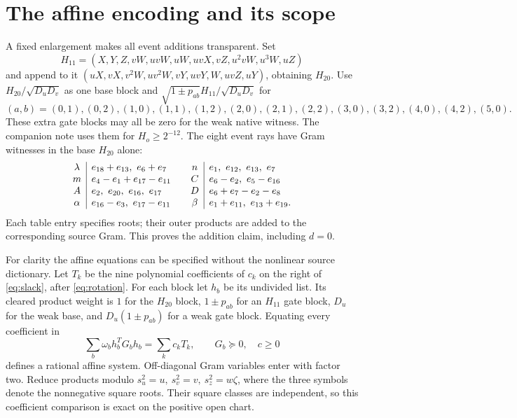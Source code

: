 \documentclass[10pt]{article}
\newcommand{\ps}{\succeq}
\begin{document}
\section{The affine encoding and its scope}\label{sec:encoding}
A fixed enlargement makes all event additions transparent. Set
\[
 H_{11}=(X,Y,Z,vW,uvW,uW,uvX,vZ,u^2vW,u^3W,uZ)
\]
and append to it
$(uX,vX,v^2W,uv^2W,vY,uvY,W,uvZ,uY)$, obtaining $H_{20}$.
Use $H_{20}/\sqrt{D_uD_v}$ as one base block and
$\sqrt{1\pm p_{ab}}H_{11}/\sqrt{D_uD_v}$ for
\[
 (a,b)=(0,1),(0,2),(1,0),(1,1),(1,2),(2,0),(2,1),
 (2,2),(3,0),(3,2),(4,0),(4,2),(5,0).
\]
These extra gate blocks may all be zero for the weak native witness.
The companion note uses them for $H_o\geq2^{-12}$.
The eight event rays have Gram witnesses in the base $H_{20}$ alone:
\begin{equation}
\begin{array}{c|l@{\qquad}c|l}
\lambda&e_{18}+e_{13},\ e_6+e_7&
n&e_1,\ e_{12},\ e_{13},\ e_7\\
m&e_4-e_1+e_{17}-e_{11}&
C&e_6-e_2,\ e_5-e_{16}\\
A&e_2,\ e_{20},\ e_{16},\ e_{17}&
D&e_6+e_7-e_2-e_8\\
\alpha&e_{16}-e_3,\ e_{17}-e_{11}&
\beta&e_1+e_{11},\ e_{13}+e_{19}.
\end{array}\label{eq:eventrays}
\end{equation}
Each table entry specifies roots; their outer products are added to the
corresponding source Gram. This proves the addition claim, including $d=0$.

For clarity the affine equations can be specified without the nonlinear
source dictionary. Let $T_k$ be the nine polynomial coefficients of $c_k$
on the right of \eqref{eq:slack}, after \eqref{eq:rotation}.
For each block let $h_b$ be its undivided list. Its cleared product weight
is $1$ for the $H_{20}$ block, $1\pm p_{ab}$ for an $H_{11}$ gate block,
$D_u$ for the weak base, and $D_u(1\pm p_{ab})$ for a weak gate block.
Equating every coefficient in
\begin{equation}
 \sum_b\omega_b h_b^TG_bh_b=\sum_k c_kT_k,\qquad G_b\ps0,\quad c\geq0
 \label{eq:affine}
\end{equation}
defines a rational affine system. Off-diagonal Gram variables enter with
factor two. Reduce products modulo
$s_u^2=u,\ s_v^2=v,\ s_z^2=w\zeta$, where the three symbols denote the
nonnegative square roots. Their square classes are independent, so this
coefficient comparison is exact on the positive open chart.
\end{document}
